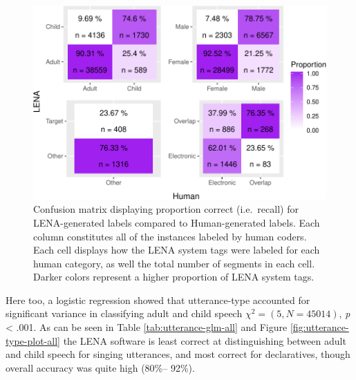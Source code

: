 \documentclass[man,floatsintext]{apa6}
\theoremstyle{definition}
\theoremstyle{definition}
\theoremstyle{definition}
\theoremstyle{remark}
\begin{document}
\begin{figure}
\centering
\includegraphics{LTR_manuscript_files/figure-latex/all-comparison-plot-1.pdf}
\caption{\label{fig:all-comparison-plot}Confusion matrix displaying
proportion correct (i.e.~recall) for LENA-generated labels compared to
Human-generated labels. Each column constitutes all of the instances
labeled by human coders. Each cell displays how the LENA system tags
were labeled for each human category, as well the total number of
segments in each cell. Darker colors represent a higher proportion of
LENA system tags.}
\end{figure}

Here too, a logistic regression showed that utterance-type accounted for
significant variance in classifying adult and child speech
\(\chi^2 = (5, N=45014)\), \emph{p} \textless{} .001. As can be seen in
Table \ref{tab:utterance-glm-all} and Figure
\ref{fig:utterance-type-plot-all} the LENA software is least correct at
distinguishing between adult and child speech for singing utterances,
and most correct for declaratives, though overall accuracy was quite
high (80\%-- 92\%).
\end{document}
